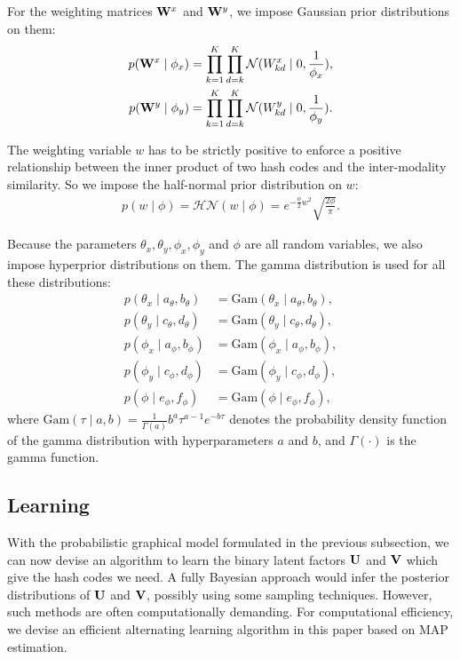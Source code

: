For the weighting matrices ${\bf W}^{x}$ and ${\bf W}^{y}$, we impose Gaussian prior distributions on them:
\begin{align}
p({\bf W}^{x} \mid \phi_x)  &= \prod\limits_{k=1}^{K}\prod\limits_{d=k}^{K} \mathcal{N}(W^{x}_{kd} \mid 0,\frac{1}{\phi_x}),\nonumber\\
p({\bf W}^{y} \mid \phi_y)  &=\prod\limits_{k=1}^{K}\prod\limits_{d=k}^{K} \mathcal{N}(W^{y}_{kd} \mid 0,\frac{1}{\phi_y}).\nonumber
\end{align}

The weighting variable $w$ has to be strictly positive to enforce a positive relationship between the inner product of two hash codes and the inter-modality similarity.  So we impose the half-normal prior distribution on $w$:
\begin{align}
p(w \mid \phi)  = \mathcal{HN}(w \mid \phi) = e^{-\frac{\phi}{2}w^2}\sqrt{\frac{2\phi}{\pi}}.\nonumber
\end{align}

Because the parameters $\theta_x, \theta_y, \phi_x, \phi_y$ and $\phi$ are all random variables, we also impose hyperprior distributions on them.  The gamma distribution is used for all these distributions:
\begin{align}
p(\theta_x\mid a_{\theta},b_{\theta}) &= \mbox{Gam}(\theta_x\mid a_{\theta},b_{\theta}),\nonumber\\
p(\theta_y\mid c_{\theta},d_{\theta}) &= \mbox{Gam}(\theta_y\mid c_{\theta},d_{\theta}),\nonumber\\
p(\phi_x\mid a_{\phi},b_{\phi}) &= \mbox{Gam}(\phi_x\mid a_{\phi},b_{\phi}),\nonumber\\
p(\phi_y\mid c_{\phi},d_{\phi}) &= \mbox{Gam}(\phi_y\mid c_{\phi},d_{\phi}),\nonumber\\
p(\phi\mid e_{\phi}, f_{\phi}) &= \mbox{Gam}(\phi\mid e_{\phi},f_{\phi}),\nonumber
\end{align}
where $\mbox{Gam}(\tau\mid a,b) = \frac{1}{\Gamma(a)}b^a\tau^{a-1}e^{-b\tau}$ denotes the probability density function of the gamma distribution with hyperparameters $a$ and $b$, and $\Gamma(\cdot)$ is the gamma function.

\subsection{Learning}

With the probabilistic graphical model formulated in the previous subsection, we can now devise an algorithm to learn the binary latent factors ${\bf U}$ and ${\bf V}$ which give the hash codes we need.  A fully Bayesian approach would infer the posterior distributions of ${\bf U}$ and ${\bf V}$, possibly using some sampling techniques.  However, such methods are often computationally demanding.  For computational efficiency, we devise an efficient alternating learning algorithm in this paper based on MAP estimation.


